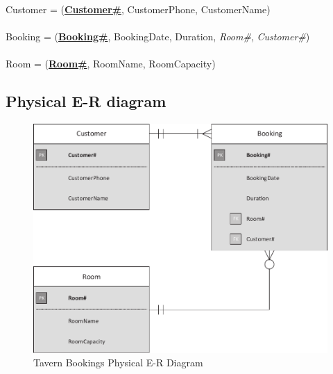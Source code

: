 Customer = (\textbf{\underline{Customer\#}}, CustomerPhone, CustomerName)
\\\\
Booking = (\textbf{\underline{Booking\#}}, BookingDate, Duration, \emph{Room\#}, \emph{Customer\#})
\\\\
Room = (\textbf{\underline{Room\#}}, RoomName, RoomCapacity)

\subsection{Physical E-R diagram}

\begin{figure}[H]
\centering
\caption{Tavern Bookings Physical E-R Diagram}
\includegraphics[scale=0.5]{./img/CSG1207_A1_PONCE_TASK_1_PER_BOOKING.pdf}
\end{figure}